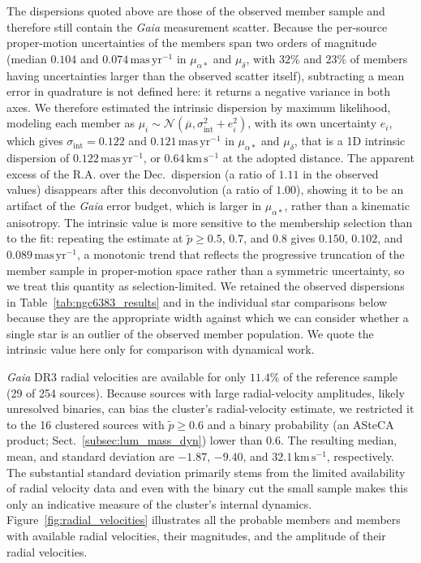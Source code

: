 \documentclass{aa}
\begin{document}
The dispersions quoted above are those of the observed member sample and therefore still contain the \textit{Gaia} measurement scatter. Because the per-source proper-motion uncertainties of the members span two orders of magnitude (median $0.104$ and $0.074\,\mathrm{mas\,yr^{-1}}$ in $\mu_{\alpha*}$ and $\mu_\delta$, with $32\%$ and $23\%$ of members having uncertainties larger than the observed scatter itself), subtracting a mean error in quadrature is not defined here: it returns a negative variance in both axes. We therefore estimated the intrinsic dispersion by maximum likelihood, modeling each member as $\mu_i \sim \mathcal{N}(\overline{\mu}, \sigma_{\mathrm{int}}^2 + e_i^2)$, with its own uncertainty $e_i$, which gives $\sigma_{\mathrm{int}} = 0.122$ and $0.121\,\mathrm{mas\,yr^{-1}}$ in $\mu_{\alpha*}$ and $\mu_\delta$, that is a 1D intrinsic dispersion of $0.122\,\mathrm{mas\,yr^{-1}}$, or $0.64\,\mathrm{km\,s^{-1}}$ at the adopted distance. The apparent excess of the R.A. over the Dec.\ dispersion (a ratio of $1.11$ in the observed values) disappears after this deconvolution (a ratio of $1.00$), showing it to be an artifact of the \textit{Gaia} error budget, which is larger in $\mu_{\alpha*}$, rather than a kinematic anisotropy. The intrinsic value is more sensitive to the membership selection than to the fit: repeating the estimate at $\tilde{p}\geq0.5$, $0.7$, and $0.8$ gives $0.150$, $0.102$, and $0.089\,\mathrm{mas\,yr^{-1}}$, a monotonic trend that reflects the progressive truncation of the member sample in proper-motion space rather than a symmetric uncertainty, so we treat this quantity as selection-limited. We retained the observed dispersions in Table~\ref{tab:ngc6383_results} and in the individual star comparisons below because they are the appropriate width against which we can consider whether a single star is an outlier of the observed member population. We quote the intrinsic value here only for comparison with dynamical work.

\textit{Gaia} DR3 radial velocities are available for only $11.4$\% of the reference sample (29 of 254 sources). Because sources with large radial-velocity amplitudes, likely unresolved binaries, can bias the cluster's radial-velocity estimate, we restricted it to the 16 clustered sources with $\tilde{p}\geq0.6$ and a binary probability (an ASteCA product; Sect.~\ref{subsec:lum_mass_dyn}) lower than $0.6$. The resulting median, mean, and standard deviation are $-1.87$, $-9.40$, and $32.1\,\mathrm{km\,s^{-1}}$, respectively. The substantial standard deviation primarily stems from the limited availability of radial velocity data and even with the binary cut the small sample makes this only an indicative measure of the cluster's internal dynamics. Figure~\ref{fig:radial_velocities} illustrates all the probable members and members with available radial velocities, their magnitudes, and the amplitude of their radial velocities.
\end{document}
